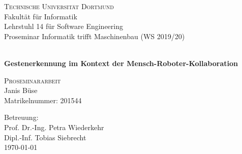 \begin{titlepage}
	\begin{center}
		{\LARGE \textsc{Technische Universität Dortmund}} \\[4ex]
		{\Large Fakultät für Informatik\\
		Lehrstuhl 14 für Software Engineering \\
		Proseminar Informatik trifft Maschinenbau (WS 2019/20)\\}
	\end{center}
  \vspace*{6ex}
  \begin{center}
    {\Huge \textbf{~\\
    Gestenerkennung im Kontext der Mensch-Roboter-Kollaboration} \\}
  \end{center}
  \vspace*{6ex}
  \begin{center}
  	{\huge \textsc{Proseminararbeit} \\[6ex] }
    {\Large Janis Büse \\
    Matrikelnummer: 201544 \\}
    \end{center}
    \vspace*{6ex}
	\begin{flushleft}
        {\large
        Betreuung: \\
		Prof. Dr.-Ing. Petra Wiederkehr \\
		Dipl.-Inf. Tobias Siebrecht \\
		\vspace*{2ex}
		\today \\}
	\end{flushleft}	
\end{titlepage}
